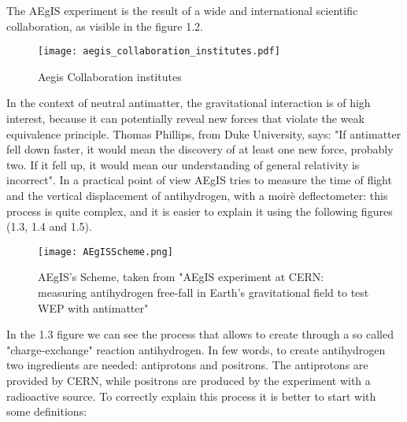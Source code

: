 The AEgIS experiment is the result of a wide and international scientific collaboration, as visible in the figure 1.2.

\begin{figure}[H]
\centering 
\texttt{[image: aegis\_collaboration\_institutes.pdf]} 
\caption{Aegis Collaboration institutes}
\end{figure}


In the context of neutral antimatter, the gravitational interaction is of high interest, because it can potentially reveal new forces that violate the weak equivalence principle. Thomas Phillips, from Duke University, says: "If antimatter fell down faster, it would mean the discovery of at least one new force, probably two. If it fell up, it would mean our understanding of general relativity is incorrect". In a practical point of view AEgIS tries to measure the time of flight and the vertical displacement of antihydrogen, with a moirè deflectometer: this process is quite complex, and it is easier to explain it using the following figures (1.3, 1.4 and 1.5).

\begin{figure}[H]
\centering 
\texttt{[image: AEgISScheme.png]} 
\caption{AEgIS's Scheme, taken from "AEgIS experiment at CERN: measuring antihydrogen free-fall in Earth’s gravitational field to test WEP with antimatter"}
\end{figure}

In the 1.3 figure we can see the process that allows to create through a so called "charge-exchange" reaction antihydrogen. In few words, to create antihydrogen two ingredients are needed: antiprotons and positrons. The antiprotons are provided by CERN, while positrons are produced by the experiment with a radioactive source. To correctly explain this process it is better to start with some definitions:


